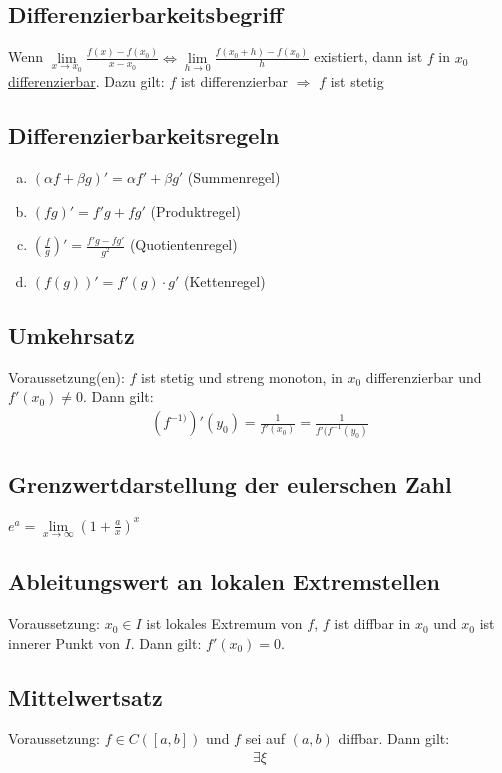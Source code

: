 \documentclass{article}
\begin{document}
\subsection{Differenzierbarkeitsbegriff}
Wenn $\lim \limits_{x \to x_0} \frac{f(x) - f(x_0)}{x - x_0}\Leftrightarrow \lim \limits_{h \to 0} \frac{f(x_0 + h) - f(x_0)}{h}$ existiert,
dann ist $f$ in $x_0$ \underline{differenzierbar}. Dazu gilt: $f$ ist differenzierbar $\Rightarrow$ $f$ ist stetig

\subsection{Differenzierbarkeitsregeln}
\begin{enumerate}[a)]
    \item $(\alpha f + \beta g)' = \alpha f' + \beta g'$ (Summenregel)
    \item $(fg)' = f'g + fg'$ (Produktregel)
    \item $(\frac{f}{g})' = \frac{f'g - fg'}{g^2}$ (Quotientenregel)
    \item $(f(g))' = f'(g) \cdot g'$ (Kettenregel)
\end{enumerate}

\subsection{Umkehrsatz}
Voraussetzung(en): $f$ ist stetig und streng monoton, in $x_0$ differenzierbar und $f'(x_0) \neq 0$. Dann gilt: \\
\begin{align*}
    (f^{-1)})'(y_0) = \frac{1}{f'(x_0)} = \frac{1}{f'(f^{-1}(y_0)}
\end{align*}

\subsection{Grenzwertdarstellung der eulerschen Zahl}
$e^{a} = \lim \limits_{x \to \infty} (1 + \frac{a}{x})^x$

\subsection{Ableitungswert an lokalen Extremstellen}
Voraussetzung: $x_0 \in I$ ist lokales Extremum von $f$, $f$ ist diffbar in $x_0$ und $x_0$ ist innerer Punkt von $I$. Dann gilt: $f'(x_0) = 0$.

\subsection{Mittelwertsatz}
Voraussetzung: $f \in C([a,b])$ und $f$ sei auf $(a,b)$ diffbar. Dann gilt: 
\begin{align*}
    \exists \xi
\end{align*}
\end{document}
